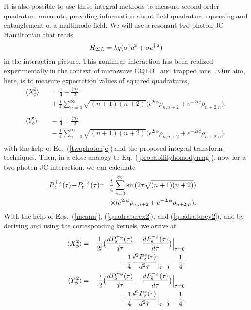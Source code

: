\documentclass[pra,aps,twocolumn,showpacs]{revtex4}
\begin{document}
It is also possible to use these integral methods to measure
second-order quadrature moments, providing information about field
quadrature squeezing and entanglement of a multimode field. We
will use a resonant two-photon JC Hamiltonian that reads
\begin{eqnarray}
\label{twophotonjc} H_{\rm 2JC} = \hbar g ( \sigma^{\dagger} a^2 +
\sigma a^{\dagger \, 2} )
\end{eqnarray}
in the interaction picture. This nonlinear interaction has been
realized experimentally in the context of microwave
CQED~\cite{Haroche} and trapped ions~\cite{Wineland}. Our aim,
here, is to measure expectation values of squared quadratures,
\begin{eqnarray}
\label{quadraturex2} \langle X^{2}_{\phi} \rangle && \!\!\!\!\!\!
= \frac{1}{4} + \frac{ \langle n \rangle }{2} \nonumber \\
&& \!\!\!\!\!\!\!\!\!\!\!\! + \frac{1}{4} \sum^{\infty}_{n=0}
\sqrt{(n+1)(n+2)} \big( e^{2i\phi}\rho_{n , n+2} +  e^{-2i\phi}
\rho_{n+2 , n} \big)
, \nonumber \\ \\
\label{quadraturey2} \langle Y^{2}_{\phi} \rangle && \!\!\!\!\!\!
= \frac{1}{4} + \frac{ \langle n \rangle }{2} \nonumber \\
&& \!\!\!\!\!\!\!\!\!\!\!\! - \frac{1}{4} \sum^{\infty}_{n=0}
\sqrt{(n+1)(n+2)} \big( e^{2i\phi}\rho_{n , n+2} +  e^{-2i\phi}
\rho_{n+2 , n} \big)
  . \nonumber \\
\end{eqnarray}
with the help of Eq.~(\ref{twophotonjc}) and the proposed integral
transform techniques. Then, in a close analogy to
Eq.~(\ref{probabilityhomodyning}), now for a two-photon JC
interaction, we can calculate
\begin{eqnarray}
\label{prodif2ph} \!\!\!\!\!\! P^{+_{\phi}}_{\rm g}(\tau) \! - \!
P^{-_{\phi}}_{\rm g}(\tau) & \!\! = \!\! & \frac{i}{4}
\sum^{\infty}_{n=0} \sin(2 \tau \sqrt{(n+1)(n+2)}) \nonumber\\ &
& \times (e^{2i\phi}\rho_{n , n+2} + e^{-2i\phi}\rho_{n+2 , n}).
\end{eqnarray}
With the help of Eqs.~(\ref{meann}), (\ref{quadraturex2}), and
(\ref{quadraturey2}), and by deriving and using the corresponding
kernels, we arrive at
\begin{eqnarray}
\label{squareX} \langle X^{2}_{\phi} \rangle & = & \frac{1}{2i}
\big( \frac{d P^{+_{\phi}}_{\rm g}(\tau)}{d\tau} -
\frac{d P^{-_{\phi}}_{\rm g}(\tau)}{d \tau} \big) \Big|_{\tau=0}
\nonumber\\
& & + \frac{1}{4} \frac{d^{2}P_{\rm g}^{\rm e} (\tau)}{d^{2}\tau}
\Big|_{\tau=0} - \frac{1}{4} , \\
\label{squareY} \langle Y^{2}_{\phi} \rangle & = & \frac{i}{2}
\big( \frac{d P^{+_{\phi}}_{\rm g}(\tau)}{d\tau} -
\frac{d P^{-_{\phi}}_{\rm g} (\tau)}{d \tau} \big) \Big|_{\tau=0}
\nonumber\\
& & + \frac{1}{4} \frac{d^{2}P_{\rm g}^{\rm e} (\tau)}{d^{2}\tau}
\Big|_{\tau=0} - \frac{1}{4} .
\end{eqnarray}
\end{document}
